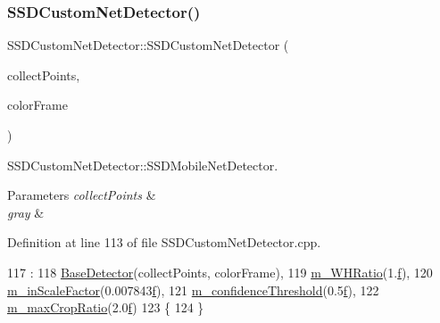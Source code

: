 \subsubsection{\texorpdfstring{S\+S\+D\+Custom\+Net\+Detector()}{SSDCustomNetDetector()}}
{\footnotesize\ttfamily S\+S\+D\+Custom\+Net\+Detector\+::\+S\+S\+D\+Custom\+Net\+Detector (\begin{DoxyParamCaption}\item[{bool}]{collect\+Points,  }\item[{cv\+::\+U\+Mat \&}]{color\+Frame }\end{DoxyParamCaption})}



S\+S\+D\+Custom\+Net\+Detector\+::\+S\+S\+D\+Mobile\+Net\+Detector. 


\begin{DoxyParams}{Parameters}
{\em collect\+Points} & \\
\hline
{\em gray} & \\
\hline
\end{DoxyParams}


Definition at line 113 of file S\+S\+D\+Custom\+Net\+Detector.\+cpp.


\begin{DoxyCode}
117     :
118     \mbox{\hyperlink{class_base_detector_a3c85e13a47dd472319dc43c60f0d102a}{BaseDetector}}(collectPoints, colorFrame),
119     \mbox{\hyperlink{class_s_s_d_custom_net_detector_a31c168d1239dfd0c485afeea9a88a2e9}{m\_WHRatio}}(1.\mbox{\hyperlink{rings_8cpp_a77369fc4d5326a16d2c603e032023528}{f}}),
120     \mbox{\hyperlink{class_s_s_d_custom_net_detector_a259cb4e414d34637f97b08cd9eaf7067}{m\_inScaleFactor}}(0.007843\mbox{\hyperlink{rings_8cpp_a77369fc4d5326a16d2c603e032023528}{f}}),
121     \mbox{\hyperlink{class_s_s_d_custom_net_detector_aa35b98cccf01cd5e9843a1e0c281a03d}{m\_confidenceThreshold}}(0.5\mbox{\hyperlink{rings_8cpp_a77369fc4d5326a16d2c603e032023528}{f}}),
122     \mbox{\hyperlink{class_s_s_d_custom_net_detector_a41f65cc3327a94be76280cb2ad7f46f8}{m\_maxCropRatio}}(2.0\mbox{\hyperlink{rings_8cpp_a77369fc4d5326a16d2c603e032023528}{f}})
123 \{
124 \}
\end{DoxyCode}
\mbox{\label{class_s_s_d_custom_net_detector_af64774d3fabf485a810eee39f1a7d278}} 
